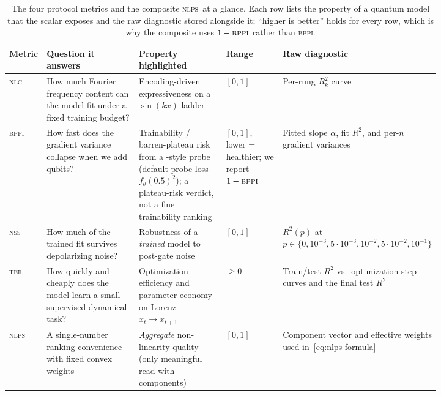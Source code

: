 \documentclass{article}
\newcommand{\nlc}{\textsc{nlc}}
\newcommand{\bppi}{\textsc{bppi}}
\newcommand{\nss}{\textsc{nss}}
\newcommand{\ter}{\textsc{ter}}
\newcommand{\nlps}{\textsc{nlps}}
\begin{document}
\begin{table}[t]
  \caption{The four protocol metrics and the composite \nlps\ at a glance. Each row lists the property of a quantum model that the scalar exposes and the raw diagnostic stored alongside it; ``higher is better'' holds for every row, which is why the composite uses $1-\bppi$ rather than \bppi.}
  \label{tab:metric-cheatsheet}
  \centering
  \footnotesize
  \setlength{\tabcolsep}{4pt}
  \begin{tabular}{lp{0.24\linewidth}p{0.22\linewidth}p{0.14\linewidth}p{0.22\linewidth}}
    \toprule
    Metric & Question it answers & Property highlighted & Range & Raw diagnostic \\
    \midrule
    \nlc & How much Fourier frequency content can the model fit under a fixed training budget? & Encoding-driven expressiveness on a $\sin(kx)$ ladder & $[0, 1]$ & Per-rung $R^2_k$ curve \\
    \midrule
    \bppi & How fast does the gradient variance collapse when we add qubits? & Trainability / barren-plateau risk from a \citet{mcclean2018barren}-style probe (default probe loss $f_\theta(0.5)^2$); a plateau-risk verdict, not a fine trainability ranking & $[0, 1]$, lower = healthier; we report $1-\bppi$ & Fitted slope $\alpha$, fit $R^2$, and per-$n$ gradient variances \\
    \midrule
    \nss & How much of the trained fit survives depolarizing noise? & Robustness of a \emph{trained} model to post-gate noise & $[0, 1]$ & $R^2(p)$ at $p\in\{0, 10^{-3}, 5\cdot 10^{-3}, 10^{-2}, 5\cdot 10^{-2}, 10^{-1}\}$ \\
    \midrule
    \ter & How quickly and cheaply does the model learn a small supervised dynamical task? & Optimization efficiency and parameter economy on Lorenz $x_t\to x_{t+1}$ & $\ge 0$ & Train/test $R^2$ vs.\ optimization-step curves and the final test $R^2$ \\
    \midrule
    \nlps & A single-number ranking convenience with fixed convex weights & \emph{Aggregate} non-linearity quality (only meaningful read with components) & $[0, 1]$ & Component vector and effective weights used in~\eqref{eq:nlps-formula} \\
    \bottomrule
  \end{tabular}
\end{table}
\end{document}
